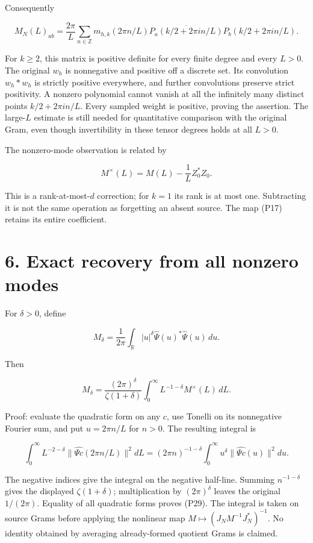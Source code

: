 \documentclass[
]{article}
\begin{document}
Consequently

\[
M_N(L)_{ab}=\frac{2\pi}{L}\sum_{n\in\mathbb Z}
m_{h,k}(2\pi n/L)
\overline{P_a(k/2+2\pi i n/L)}P_b(k/2+2\pi i n/L).
\tag{P26b}
\]

For \(k\ge2\), this matrix is positive definite for every finite degree
and every \(L>0\). The original \(w_h\) is nonnegative and positive off
a discrete set. Its convolution \(w_h*w_h\) is strictly positive
everywhere, and further convolutions preserve strict positivity. A
nonzero polynomial cannot vanish at all the infinitely many distinct
points \(k/2+2\pi i n/L\). Every sampled weight is positive, proving the
assertion. The large-\(L\) estimate is still needed for quantitative
comparison with the original Gram, even though invertibility in these
tensor degrees holds at all \(L>0\).

The nonzero-mode observation is related by

\[
M^\times(L)=M(L)-\frac1LZ_0^*Z_0.
\tag{P27}
\]

This is a rank-at-most-\(d\) correction; for \(k=1\) its rank is at most
one. Subtracting it is not the same operation as forgetting an absent
source. The map (P17) retains its entire coefficient.

\section{6. Exact recovery from all nonzero
modes}\label{exact-recovery-from-all-nonzero-modes}

For \(\delta>0\), define

\[
M_\delta=\frac1{2\pi}\int_{\mathbb R}|u|^\delta
\widehat\Psi(u)^*\widehat\Psi(u)\,du.
\tag{P28}
\]

Then

\[
\boxed{M_\delta=
\frac{(2\pi)^\delta}{\zeta(1+\delta)}
\int_0^\infty L^{-1-\delta}M^\times(L)\,dL.}
\tag{P29}
\]

Proof: evaluate the quadratic form on any \(c\), use Tonelli on its
nonnegative Fourier sum, and put \(u=2\pi n/L\) for \(n>0\). The
resulting integral is

\[
\int_0^\infty L^{-2-\delta}
\|\widehat{\Psi c}(2\pi n/L)\|^2dL
=(2\pi n)^{-1-\delta}
\int_0^\infty u^\delta\|\widehat{\Psi c}(u)\|^2du.
\tag{P30}
\]

The negative indices give the integral on the negative half-line.
Summing \(n^{-1-\delta}\) gives the displayed \(\zeta(1+\delta)\);
multiplication by \((2\pi)^\delta\) leaves the original \(1/(2\pi)\).
Equality of all quadratic forms proves (P29). The integral is taken on
source Grams before applying the nonlinear map
\(M\mapsto(J_NM^{-1}J_N^*)^{-1}\). No identity obtained by averaging
already-formed quotient Grams is claimed.
\end{document}
